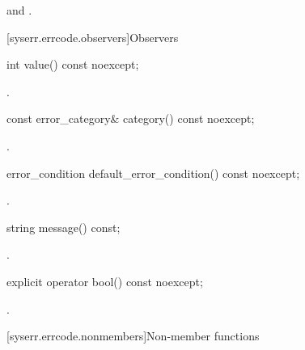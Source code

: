 \begin{itemdescr}
\pnum
\ensures {} and .
\end{itemdescr}


[syserr.errcode.observers]{Observers}

%
\begin{itemdecl}
int value() const noexcept;
\end{itemdecl}

\begin{itemdescr}
\pnum
\returns {}.
\end{itemdescr}

%
\begin{itemdecl}
const error_category& category() const noexcept;
\end{itemdecl}

\begin{itemdescr}
\pnum
\returns {}.
\end{itemdescr}

%
\begin{itemdecl}
error_condition default_error_condition() const noexcept;
\end{itemdecl}

\begin{itemdescr}
\pnum
\returns {}.
\end{itemdescr}

%
\begin{itemdecl}
string message() const;
\end{itemdecl}

\begin{itemdescr}
\pnum
\returns {}.
\end{itemdescr}

%
\begin{itemdecl}
explicit operator bool() const noexcept;
\end{itemdecl}

\begin{itemdescr}
\pnum
\returns {}.
\end{itemdescr}

[syserr.errcode.nonmembers]{Non-member functions}

